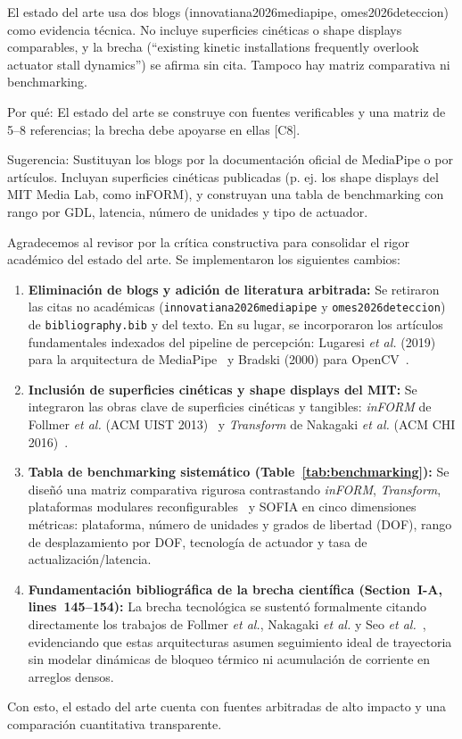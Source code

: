 \documentclass{LabDSTresponse}
\begin{document}
{El estado del arte usa dos blogs (innovatiana2026mediapipe, omes2026deteccion) como evidencia técnica. No incluye superficies cinéticas o shape displays comparables, y la brecha (“existing kinetic installations frequently overlook actuator stall dynamics”) se afirma sin cita. Tampoco hay matriz comparativa ni benchmarking.

Por qué: El estado del arte se construye con fuentes verificables y una matriz de 5–8 referencias; la brecha debe apoyarse en ellas [C8].

Sugerencia: Sustituyan los blogs por la documentación oficial de MediaPipe o por artículos. Incluyan superficies cinéticas publicadas (p. ej. los shape displays del MIT Media Lab, como inFORM), y construyan una tabla de benchmarking con rango por GDL, latencia, número de unidades y tipo de actuador.}
{Agradecemos al revisor por la crítica constructiva para consolidar el rigor académico del estado del arte. Se implementaron los siguientes cambios:
\begin{enumerate}
    \item \textbf{Eliminación de blogs y adición de literatura arbitrada:} Se retiraron las citas no académicas (\texttt{innovatiana2026mediapipe} y \texttt{omes2026deteccion}) de \texttt{bibliography.bib} y del texto. En su lugar, se incorporaron los artículos fundamentales indexados del pipeline de percepción: Lugaresi \textit{et al.} (2019) para la arquitectura de MediaPipe~\cite{lugaresi2019mediapipe} y Bradski (2000) para OpenCV~\cite{bradski2000opencv}.
    \item \textbf{Inclusión de superficies cinéticas y shape displays del MIT:} Se integraron las obras clave de superficies cinéticas y tangibles: \textit{inFORM} de Follmer \textit{et al.} (ACM UIST 2013)~\cite{follmer2013inform} y \textit{Transform} de Nakagaki \textit{et al.} (ACM CHI 2016)~\cite{nakagaki2016transform}.
    \item \textbf{Tabla de benchmarking sistemático (Table~\ref{tab:benchmarking}):} Se diseñó una matriz comparativa rigurosa contrastando \textit{inFORM}, \textit{Transform}, plataformas modulares reconfigurables~\cite{seo2019modular} y SOFIA en cinco dimensiones métricas: plataforma, número de unidades y grados de libertad (DOF), rango de desplazamiento por DOF, tecnología de actuador y tasa de actualización/latencia.
    \item \textbf{Fundamentación bibliográfica de la brecha científica (Section~I-A, lines~145--154):} La brecha tecnológica se sustentó formalmente citando directamente los trabajos de Follmer \textit{et al.}, Nakagaki \textit{et al.} y Seo \textit{et al.}~\cite{follmer2013inform,nakagaki2016transform,seo2019modular}, evidenciando que estas arquitecturas asumen seguimiento ideal de trayectoria sin modelar dinámicas de bloqueo térmico ni acumulación de corriente en arreglos densos.
\end{enumerate}
Con esto, el estado del arte cuenta con fuentes arbitradas de alto impacto y una comparación cuantitativa transparente.}
\end{document}
